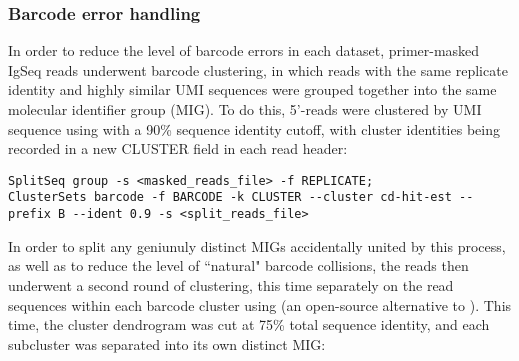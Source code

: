 \subsubsection{Barcode error handling}
\label{sec:methods_comp_igpreproc_correct}

%

In order to reduce the level of barcode errors in each dataset, primer-masked IgSeq reads underwent barcode clustering, in which reads with the same replicate identity and highly similar UMI sequences were grouped together into the same molecular identifier group (MIG). To do this, 5'-reads were clustered by UMI sequence using   \parencite{li2006cdhit,fu2012cdhit} with a 90\% sequence identity cutoff, with cluster identities being recorded in a new CLUSTER field in each read header:

\begin{lstlisting}
SplitSeq group -s <masked_reads_file> -f REPLICATE;
ClusterSets barcode -f BARCODE -k CLUSTER --cluster cd-hit-est --prefix B --ident 0.9 -s <split_reads_file>
\end{lstlisting}

In order to split any geniunuly distinct MIGs accidentally united by this process, as well as to reduce the level of ``natural" barcode collisions, the reads then underwent a second round of clustering, this time separately on the read sequences within each barcode cluster using  (an open-source alternative to  \parencite{edgar2010usearch,rognes2016vsearch}).
This time, the cluster dendrogram was cut at 75\% total sequence identity, and each subcluster was separated into its own distinct MIG:

